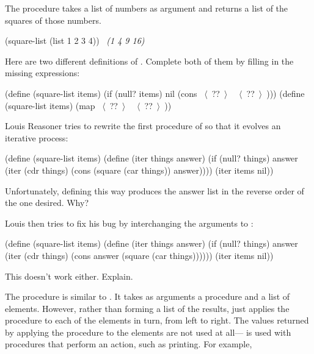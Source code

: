 \begin{exerciseGroup}
\label{Exercise 2.21}
 The procedure 
takes a list of numbers as argument and returns a list of the squares of those
numbers.

\begin{codeBlock}
(square-list (list 1 2 3 4))
~\textit{(1 4 9 16)}~
\end{codeBlock}

Here are two different definitions of .  Complete both of
them by filling in the missing expressions:

\begin{codeBlock}
(define (square-list items)
  (if (null? items)
      nil
      (cons ~\(\langle \)~??~\(\rangle \)~ ~\(\langle \)~??~\(\rangle \)~)))
(define (square-list items)
  (map ~\(\langle \)~??~\(\rangle \)~ ~\(\langle \)~??~\(\rangle \)~))
\end{codeBlock}

\label{Exercise 2.22}
 Louis Reasoner tries to rewrite
the first  procedure of  so that it
evolves an iterative process:

\begin{codeBlock}
(define (square-list items)
  (define (iter things answer)
    (if (null? things)
        answer
        (iter (cdr things)
              (cons (square (car things))
                    answer))))
  (iter items nil))
\end{codeBlock}

Unfortunately, defining  this way produces the answer list in
the reverse order of the one desired.  Why?

Louis then tries to fix his bug by interchanging the arguments to :

\begin{codeBlock}
(define (square-list items)
  (define (iter things answer)
    (if (null? things)
        answer
        (iter (cdr things)
              (cons answer
                    (square (car things))))))
  (iter items nil))
\end{codeBlock}

This doesn't work either.  Explain.

\label{Exercise 2.23}
 The procedure  is
similar to .  It takes as arguments a procedure and a list of
elements.  However, rather than forming a list of the results, 
just applies the procedure to each of the elements in turn, from left to right.
The values returned by applying the procedure to the elements are not used at
all--- is used with procedures that perform an action, such as
printing.  For example,


\end{exerciseGroup}
